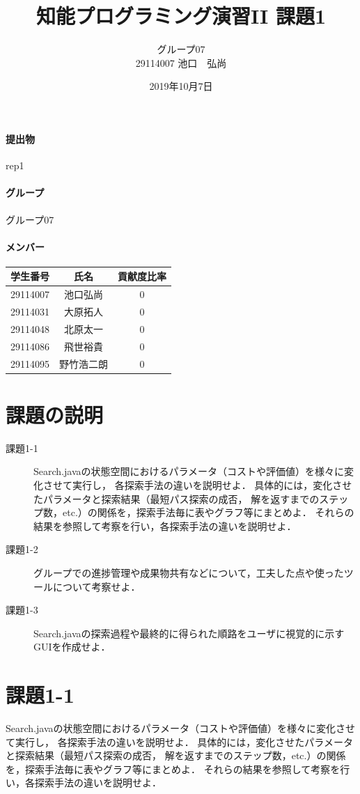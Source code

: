 ﻿\documentclass{jarticle}
\title{知能プログラミング演習II 課題1}
\author{グループ07\\
  29114007 池口　弘尚\\
}
\date{2019年10月7日}
\begin{document}
\maketitle

\paragraph{提出物} rep1
\paragraph{グループ} グループ07
\paragraph{メンバー}
\begin{tabular}{|c|c|c|}
  \hline
  学生番号&氏名&貢献度比率\\
  \hline\hline
  29114007&池口弘尚&0\\
  \hline
  29114031&大原拓人&0\\
  \hline
  29114048&北原太一&0\\
  \hline
  29114086&飛世裕貴&0\\
  \hline
  29114095&野竹浩二朗&0\\
\end{tabular}

\section{課題の説明}
\begin{description}
\item[課題1-1] Search.javaの状態空間におけるパラメータ（コストや評価値）を様々に変化させて実行し，
  各探索手法の違いを説明せよ．
  具体的には，変化させたパラメータと探索結果（最短パス探索の成否，
  解を返すまでのステップ数，etc.）の関係を，探索手法毎に表やグラフ等にまとめよ．
  それらの結果を参照して考察を行い，各探索手法の違いを説明せよ．
\item[課題1-2] グループでの進捗管理や成果物共有などについて，工夫した点や使ったツールについて考察せよ．
\item[課題1-3] Search.javaの探索過程や最終的に得られた順路をユーザに視覚的に示すGUIを作成せよ．
\end{description}


\section{課題1-1}
\begin{screen}
  Search.javaの状態空間におけるパラメータ（コストや評価値）を様々に変化させて実行し，
  各探索手法の違いを説明せよ．
  具体的には，変化させたパラメータと探索結果（最短パス探索の成否，
  解を返すまでのステップ数，etc.）の関係を，探索手法毎に表やグラフ等にまとめよ．
  それらの結果を参照して考察を行い，各探索手法の違いを説明せよ．
\end{screen}
\end{document}
